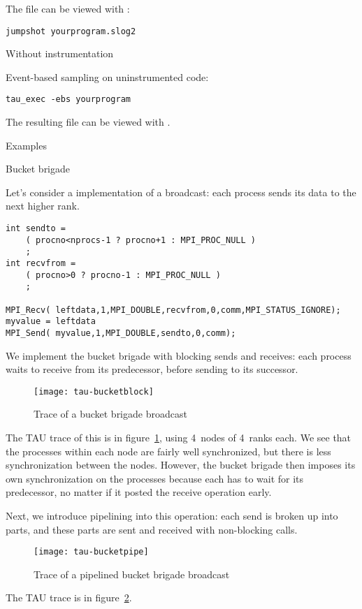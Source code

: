 The  file can be viewed with :
\begin{verbatim}
jumpshot yourprogram.slog2
\end{verbatim}

 {Without instrumentation}

Event-based sampling on uninstrumented code:
\begin{verbatim}
tau_exec -ebs yourprogram
\end{verbatim}
The resulting  file can be viewed with .

 {Examples}

 {Bucket brigade}

Let's consider a  implementation of a broadcast:
each process sends its data to the next higher rank. 
%
\begin{lstlisting}
int sendto =
    ( procno<nprocs-1 ? procno+1 : MPI_PROC_NULL )
    ;
int recvfrom =
    ( procno>0 ? procno-1 : MPI_PROC_NULL )
    ;

MPI_Recv( leftdata,1,MPI_DOUBLE,recvfrom,0,comm,MPI_STATUS_IGNORE);
myvalue = leftdata
MPI_Send( myvalue,1,MPI_DOUBLE,sendto,0,comm);
\end{lstlisting}

We implement the bucket brigade
with blocking sends and receives: each process waits to receive from its
predecessor, before sending to its successor.
%
%
\begin{figure}[ht]
\texttt{[image: tau-bucketblock]}
\caption{Trace of a bucket brigade broadcast}
\label{fig:tau-bucketblock}
\end{figure}
%
The TAU trace of this is in figure~\ref{fig:tau-bucketblock},
using 4~nodes of 4~ranks each.
We see that the processes within each node are fairly well synchronized,
but there is less synchronization between the nodes.
However, the bucket brigade then imposes its own synchronization on the processes
because each has to wait for its predecessor, no matter if it posted
the receive operation early.

Next, we introduce pipelining into this operation:
each send is broken up into parts, and these parts are sent
and received with non-blocking calls.
%
%
\begin{figure}[ht]
\texttt{[image: tau-bucketpipe]}
\caption{Trace of a pipelined bucket brigade broadcast}
\label{fig:tau-bucketpipe}
\end{figure}
%
The TAU trace is in figure~\ref{fig:tau-bucketpipe}.


